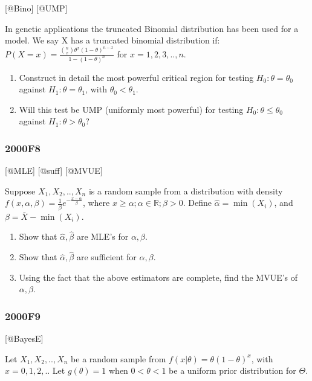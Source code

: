 \documentclass[6pt,twocolumn,Portrait]{article}
\begin{document}
{[}@Bino{]} {[}@UMP{]}

In genetic applications the truncated Binomial distribution has been
used for a model. We say X has a truncated binomial distribution if:
\(P(X=x)=\frac{\binom{n}{x}\theta^x(1-\theta)^{n-x}}{1-(1-\theta)^n}\)
for \(x=1,2,3,..,n\).

\begin{enumerate}
\def\labelenumi{\Alph{enumi})}
\item
  Construct in detail the most powerful critical region for testing
  \(H_0:\theta=\theta_0\) against \(H_1:\theta=\theta_1\), with
  \(\theta_0<\theta_1\).
\item
  Will this test be UMP (uniformly most powerful) for testing
  \(H_0:\theta\le\theta_0\) against \(H_1:\theta>\theta_0\)?
\end{enumerate}

\hypertarget{f8}{%
\subsubsection{2000F8}\label{f8}}

{[}@MLE{]} {[}@suff{]} {[}@MVUE{]}

Suppose \(X_1,X_2,..,X_n\) is a random sample from a distribution with
density \(f(x,\alpha,\beta)=\frac1{\beta}e^{-\frac{x-\alpha}\beta}\),
where \(x\ge\alpha;\alpha\in\mathbb R;\beta>0\). Define
\(\hat\alpha=\min(X_i)\), and \(\beta=\bar X-\min(X_i)\).

\begin{enumerate}
\def\labelenumi{\Alph{enumi})}
\item
  Show that \(\hat\alpha,\hat\beta\) are MLE's for \(\alpha,\beta\).
\item
  Show that \(\hat\alpha,\hat\beta\) are sufficient for
  \(\alpha,\beta\).
\item
  Using the fact that the above estimators are complete, find the MVUE's
  of \(\alpha,\beta\).
\end{enumerate}

\hypertarget{f9}{%
\subsubsection{2000F9}\label{f9}}

{[}@BayesE{]}

Let \(X_1,X_2,..,X_n\) be a random sample from
\(f(x|\theta)=\theta(1-\theta)^x\), with \(x=0,1,2,..\) Let
\(g(\theta)=1\) when \(0<\theta<1\) be a uniform prior distribution for
\(\Theta\).
\end{document}
